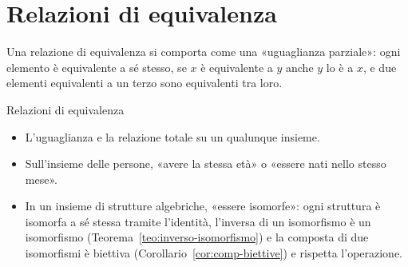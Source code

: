 \section{Relazioni di equivalenza}\label{sec:equivalenze}

Una relazione di equivalenza si comporta come una «uguaglianza parziale»: ogni elemento è equivalente a sé stesso, se $x$ è
equivalente a $y$ anche $y$ lo è a $x$, e due elementi equivalenti a un terzo sono equivalenti tra loro.

\begin{esempio}{Relazioni di equivalenza}
    \begin{itemize}
        \item L'uguaglianza e la relazione totale su un qualunque insieme.
        \item Sull'insieme delle persone, «avere la stessa età» o «essere nati nello stesso mese».
        \item In un insieme di strutture algebriche, «essere isomorfe»: ogni struttura è isomorfa a sé stessa tramite l'identità,
              l'inversa di un isomorfismo è un isomorfismo (Teorema~\ref{teo:inverso-isomorfismo}) e la composta di due
              isomorfismi è biettiva (Corollario~\ref{cor:comp-biettive}) e rispetta l'operazione.
    \end{itemize}
\end{esempio}


